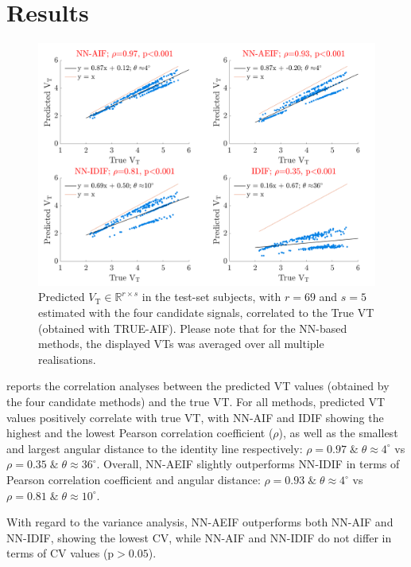 \vspace{-0.45cm}

\section{Results} \label{sec:results}
    \begin{figure}
        \vspace{-0.5cm}
        
        \centering
        
        \includegraphics[width=1.0\linewidth]{Figures/correlation.png}
        
        \vspace{-0.25cm}
        
        \captionsetup{singlelinecheck=false, justification=centering}
        \caption{
            \scriptsize
            Predicted $V_{\mathrm{T}} \in \mathbb{R}^{r \times s}$ in the test-set subjects, with $r = 69$ and $s=5$ estimated with the four candidate signals, correlated to the True \gls{VT} (obtained with TRUE-\gls{AIF}). Please note that for the \gls{NN}-based methods, the displayed \glspl{VT} was averaged over all multiple realisations.
        }
        
        \label{fig:correlation}
        
   \end{figure}

    
    reports the correlation analyses between the predicted \gls{VT} values (obtained by the four candidate methods) and the true \gls{VT}. For all methods, predicted \gls{VT} values positively correlate with true \gls{VT}, with \gls{NN}-\gls{AIF} and \gls{IDIF} showing the highest and the lowest Pearson correlation coefficient ($\rho$), as well as the smallest and largest angular distance to the identity line respectively: $\rho = 0.97 \; \& \;  \theta \approx 4^{\circ}$ vs $\rho = 0.35 \; \&  \; \theta \approx 36^{\circ}$. Overall, \gls{NN}-\gls{AE}\gls{IF} slightly outperforms \gls{NN}-\gls{IDIF} in terms of Pearson correlation coefficient and angular distance: $\rho = 0.93 \; \& \; \theta  \approx 4^{\circ}$ vs $\rho = 0.81 \; \&  \; \theta \approx 10^{\circ}$.

    With regard to the variance analysis, \gls{NN}-\gls{AE}\gls{IF} outperforms both \gls{NN}-\gls{AIF} and \gls{NN}-\gls{IDIF}, showing the lowest \gls{CV}, while \gls{NN}-\gls{AIF} and \gls{NN}-\gls{IDIF} do not differ in terms of \gls{CV} values (p$>0.05$).
